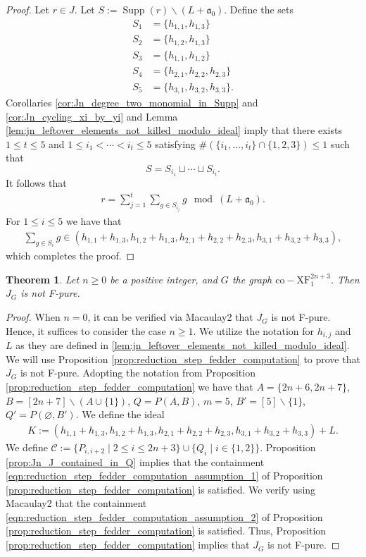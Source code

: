 \documentclass[12pt,a4paper]{amsart}
\theoremstyle{plain}
\newtheorem{thrm}{Theorem}[section]
\def\bthm{\begin{thrm}}
\def\ethm{\end{thrm}}
\theoremstyle{definition}
\def\bproof{\begin{proof}}
\def\eproof{\end{proof}}
\theoremstyle{remark}
\let\setminus=\smallsetminus
\def\a{\mathfrak{a}}
\DeclareMathOperator{\Supp}{Supp}
\newcommand{\mc}[1]{\mathcal{ #1 }}
\begin{document}
\bproof
Let $r \in J$. Let $S := \Supp(r) \setminus (L + \a_{0})$. Define the sets
\begin{align*}
    S_{1} &= \{h_{1,1},h_{1,3}\} \\
    S_{2} &= \{h_{1,2},h_{1,3}\} \\
    S_{3} &= \{h_{1,1},h_{1,2}\} \\
    S_{4} &= \{h_{2,1},h_{2,2},h_{2,3}\} \\
    S_{5} &= \{h_{3,1},h_{3,2},h_{3,3}\}.
\end{align*}
Corollaries \ref{cor:Jn_degree_two_monomial_in_Supp} and \ref{cor:Jn_cycling_xi_by_yi} and Lemma \ref{lem:jn_leftover_elements_not_killed_modulo_ideal} imply that there exists $1 \leq t \leq 5$ and $1 \leq i_{1} < \cdots < i_{t} \leq 5$ satisfying $\# \left( \{i_{1},\ldots,i_{t}\} \cap \{1,2,3\} \right) \leq 1$ such that 
\begin{equation}
    \label{eqn:Jn_reln_1}
    S = S_{i_{1}} \sqcup \cdots \sqcup S_{i_{t}}.
\end{equation}
It follows that
\begin{align*}
    r = \sum_{j = 1}^{t} \sum_{g\in S_{i_{j}}} g \mod{(L + \a_{0})}.
\end{align*}
For $1 \leq i \leq 5$ we have that 
\begin{align*}
    \sum_{g\in S_{i}} g \in (h_{1,1} + h_{1,3},h_{1,2}+h_{1,3},h_{2,1}+h_{2,2}+h_{2,3},h_{3,1}+h_{3,2}+h_{3,3}),
\end{align*}
which completes the proof.
\eproof

\bthm
\label{thm:Jn_not_F_pure}
Let $n \geq 0$ be a positive integer, and $G$ the graph $\mathrm{co\!-\!XF}_1^{2n+3}$. Then $J_{G}$ is not F-pure.
\ethm

\bproof
When $n = 0$, it can be verified via Macaulay2 that $J_{G}$ is not F-pure. Hence, it suffices to consider the case $n \geq 1$. We utilize the notation for $h_{i,j}$ and $L$ as they are defined in \ref{lem:jn_leftover_elements_not_killed_modulo_ideal}. We will use Proposition \ref{prop:reduction_step_fedder_computation} to prove that $J_{G}$ is not F-pure. Adopting the notation from Proposition \ref{prop:reduction_step_fedder_computation} we have that $A = \{2n+6,2n+7\}$, $B = [2n+7] \setminus (A\cup \{1\})$, $Q = P(A,B)$, $m = 5$, $B' = [5] \setminus \{1\}$, $Q' = P(\varnothing,B')$. We define the ideal
\begin{align*}
    K := (h_{1,1} + h_{1,3},h_{1,2}+h_{1,3},h_{2,1}+h_{2,2}+h_{2,3},h_{3,1}+h_{3,2}+h_{3,3}) + L.
\end{align*}
We define $\mc{C} := \{P_{i,i+2} \mid 2 \leq i \leq 2n+3\}\cup \{Q_{i} \mid i \in \{1,2\}\}$. Proposition \ref{prop:Jn_J_contained_in_Q} implies that the containment \eqref{eqn:reduction_step_fedder_computation_assumption_1} of Proposition \ref{prop:reduction_step_fedder_computation} is satisfied. We verify using Macaulay2 that the containment \eqref{eqn:reduction_step_fedder_computation_assumption_2} of Proposition \ref{prop:reduction_step_fedder_computation} is satisfied. Thus, Proposition \ref{prop:reduction_step_fedder_computation} implies that $J_{G}$ is not F-pure.
\eproof
\end{document}
